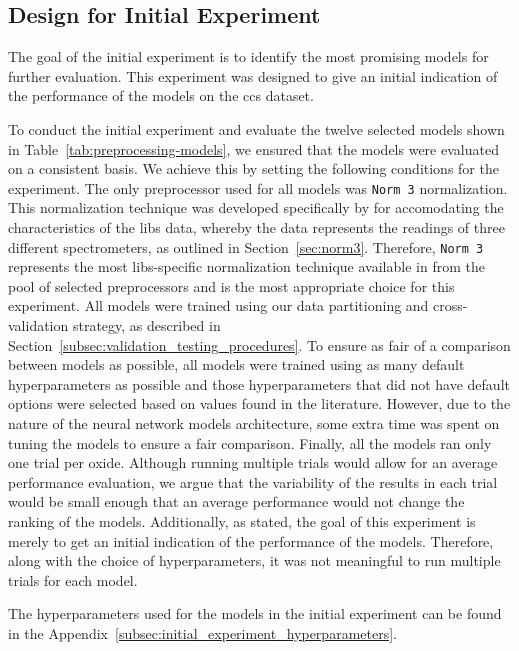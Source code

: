 \subsection{Design for Initial Experiment}\label{sec:initial-experiment}
The goal of the initial experiment is to identify the most promising models for further evaluation.
This experiment was designed to give an initial indication of the performance of the models on the \gls{ccs} dataset.

To conduct the initial experiment and evaluate the twelve selected models shown in Table~\ref{tab:preprocessing-models}, we ensured that the models were evaluated on a consistent basis.
We achieve this by setting the following conditions for the experiment.
The only preprocessor used for all models was \texttt{Norm 3} normalization.
This normalization technique was developed specifically by \citet{cleggRecalibrationMarsScience2017} for accomodating the characteristics of the \gls{libs} data, whereby the data represents the readings of three different spectrometers, as outlined in Section~\ref{sec:norm3}.
Therefore, \texttt{Norm 3} represents the most \gls{libs}-specific normalization technique available in from the pool of selected preprocessors and is the most appropriate choice for this experiment.
All models were trained using our data partitioning and cross-validation strategy, as described in Section~\ref{subsec:validation_testing_procedures}. 
To ensure as fair of a comparison between models as possible, all models were trained using as many default hyperparameters as possible and those hyperparameters that did not have default options were selected based on values found in the literature.
However, due to the nature of the neural network models architecture, some extra time was spent on tuning the models to ensure a fair comparison.
Finally, all the models ran only one trial per oxide. 
Although running multiple trials would allow for an average performance evaluation, we argue that the variability of the results in each trial would be small enough that an average performance would not change the ranking of the models. 
Additionally, as stated, the goal of this experiment is merely to get an initial indication of the performance of the models.
Therefore, along with the choice of hyperparameters, it was not meaningful to run multiple trials for each model.

The hyperparameters used for the models in the initial experiment can be found in the Appendix~\ref{subsec:initial_experiment_hyperparameters}.